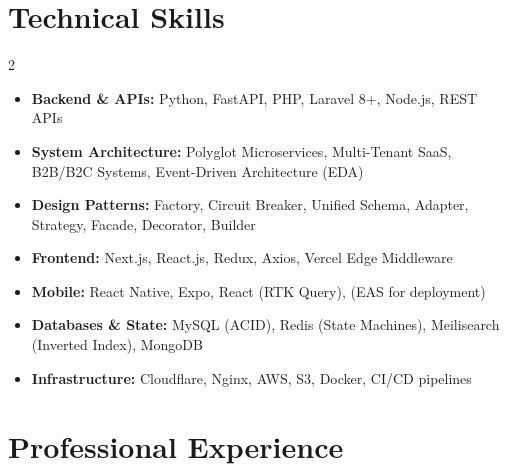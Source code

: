 \documentclass[11pt, a4paper]{article}
\newcommand{\skillcat}[2]{\textbf{\color{accent}#1:} #2}
\begin{document}
\section*{Technical Skills}
\begin{multicols}{2}
\begin{itemize}[itemsep=0.2ex]
    \item \skillcat{Backend \& APIs}{Python, FastAPI, PHP, Laravel 8+, Node.js, REST APIs}
    \item \skillcat{System Architecture}{Polyglot Microservices, Multi-Tenant SaaS, B2B/B2C Systems, Event-Driven Architecture (EDA)}
    \item \skillcat{Design Patterns}{Factory, Circuit Breaker, Unified Schema, Adapter, Strategy, Facade, Decorator, Builder}
    \item \skillcat{Frontend}{Next.js, React.js, Redux, Axios, Vercel Edge Middleware}
    \item \skillcat{Mobile}{React Native, Expo, React (RTK Query), (EAS for deployment)}
    \item \skillcat{Databases \& State}{MySQL (ACID), Redis (State Machines), Meilisearch (Inverted Index), MongoDB}
    \item \skillcat{Infrastructure}{Cloudflare, Nginx, AWS, S3, Docker, CI/CD pipelines}
\end{itemize}
\end{multicols}

\section*{Professional Experience}
\end{document}
